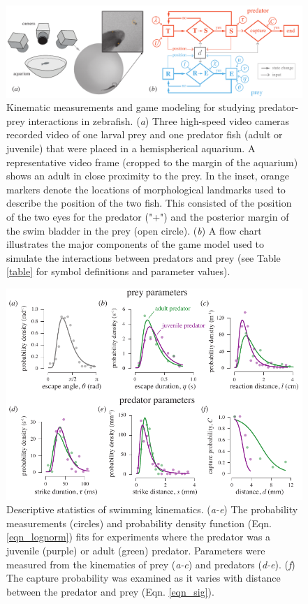 \documentclass[]{rsos}%
\begin{document}
\pagebreak

\linespread{1}\selectfont %


\begin{figure}[!h]
\centering
	\includegraphics[width=5.5in]{fig_setup}
\caption{
Kinematic measurements and game modeling for studying predator-prey interactions in zebrafish. 
(\textit{a}) Three high-speed video cameras recorded video of one larval prey and one predator fish (adult or juvenile) that were placed in a hemispherical aquarium. 
A representative video frame (cropped to the margin of the aquarium) shows an adult in close proximity to the prey. 
In the inset, orange markers denote the locations of morphological landmarks used to describe the position of the two fish.
This consisted of the position of the two eyes for the predator ("+") and the posterior margin of the swim bladder in the prey (open circle). 
 (\textit{b}) A flow chart illustrates the major components of the game model used to simulate the interactions between predators and prey (see Table \ref{table} for symbol definitions and parameter values).
 }
\label{fig_setup}
\end{figure}

\pagebreak

\begin{figure}[!h]
\centering
	\includegraphics[width=5.5in]{fig_PDFs}
\caption{
Descriptive statistics of swimming kinematics. 
(\textit{a-e}) The probability measurements (circles) and probability density function (Eqn. \ref{eqn_lognorm}) fits for experiments where the predator was a juvenile (purple) or adult (green) predator.
Parameters were measured from the kinematics of prey (\textit{a-c}) and predators (\textit{d-e}).
(\textit{f}) The capture probability was examined as it varies with distance between the predator and prey (Eqn. \ref{eqn_sig}).  
}
\label{fig_PDF}
\end{figure}
\end{document}

